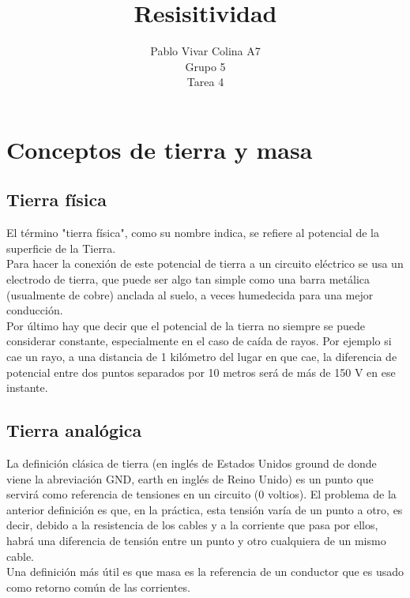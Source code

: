 \documentclass{article}
\title{Resisitividad}
\author{Pablo Vivar Colina A7\\
Grupo 5\\
Tarea 4
}
\begin{document}
\maketitle

\section{Conceptos de tierra y masa}

\subsection{Tierra física}

El término "tierra física", como su nombre indica, se refiere al potencial de la superficie de la Tierra.\citep{TT}\\

 Para hacer la conexión de este potencial de tierra a un circuito eléctrico se usa un electrodo de tierra, que puede ser algo tan simple como una barra metálica (usualmente de cobre) anclada al suelo, a veces humedecida para una mejor conducción.\citep{TT}\\

Por último hay que decir que el potencial de la tierra no siempre se puede considerar constante, especialmente en el caso de caída de rayos. Por ejemplo si cae un rayo, a una distancia de 1 kilómetro del lugar en que cae, la diferencia de potencial entre dos puntos separados por 10 metros será de más de 150 V en ese instante.\citep{TT}\\

\subsection{Tierra analógica}

La definición clásica de tierra (en inglés de Estados Unidos ground de donde viene la abreviación GND, earth en inglés de Reino Unido) es un punto que servirá como referencia de tensiones en un circuito (0 voltios). El problema de la anterior definición es que, en la práctica, esta tensión varía de un punto a otro, es decir, debido a la resistencia de los cables y a la corriente que pasa por ellos, habrá una diferencia de tensión entre un punto y otro cualquiera de un mismo cable.\citep{TT}\\

Una definición más útil es que masa es la referencia de un conductor que es usado como retorno común de las corrientes.\citep{TT}\\
\end{document}
